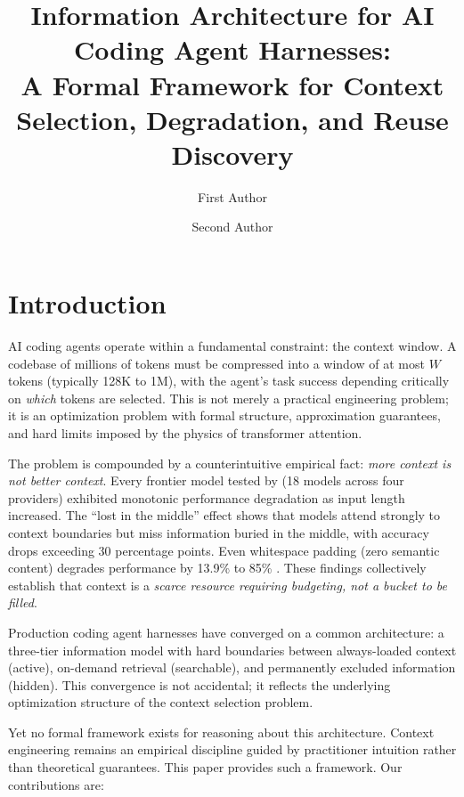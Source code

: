 \documentclass[11pt, a4paper, logo, copyright]{googledeepmind}
\title{Information Architecture for AI Coding Agent Harnesses:\\A Formal Framework for Context Selection, Degradation, and Reuse Discovery}
\author[1]{First Author}
\author[1]{Second Author}
\affil[1]{Affiliation 1}
\begin{document}
\maketitle

\section{Introduction}
\label{sec:introduction}

AI coding agents operate within a fundamental constraint: the context window. A codebase of millions of tokens must be compressed into a window of at most $W$ tokens (typically 128K to 1M), with the agent's task success depending critically on \emph{which} tokens are selected. This is not merely a practical engineering problem; it is an optimization problem with formal structure, approximation guarantees, and hard limits imposed by the physics of transformer attention.

The problem is compounded by a counterintuitive empirical fact: \emph{more context is not better context}. Every frontier model tested by \citet{chroma2025contextrot} (18 models across four providers) exhibited monotonic performance degradation as input length increased. The ``lost in the middle'' effect \citep{liu2024lost} shows that models attend strongly to context boundaries but miss information buried in the middle, with accuracy drops exceeding 30 percentage points. Even whitespace padding (zero semantic content) degrades performance by 13.9\% to 85\% \citep{du2025context}. These findings collectively establish that context is a \emph{scarce resource requiring budgeting, not a bucket to be filled}.

Production coding agent harnesses have converged on a common architecture: a three-tier information model with hard boundaries between always-loaded context (active), on-demand retrieval (searchable), and permanently excluded information (hidden). This convergence is not accidental; it reflects the underlying optimization structure of the context selection problem.

Yet no formal framework exists for reasoning about this architecture. Context engineering remains an empirical discipline guided by practitioner intuition rather than theoretical guarantees. This paper provides such a framework. Our contributions are:
\end{document}

